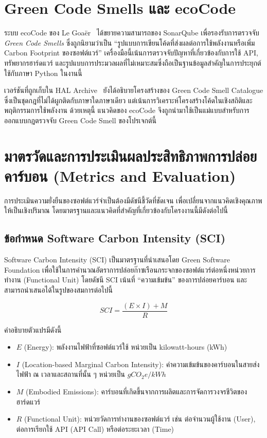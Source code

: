 
\section{Green Code Smells และ ecoCode}
ระบบ ecoCode ของ Le Goaër~\cite{legoaer2023ecocode} ได้ขยายความสามารถของ SonarQube เพื่อรองรับการตรวจจับ \textit{Green Code Smells} ซึ่งถูกนิยามว่าเป็น “รูปแบบการเขียนโค้ดที่ส่งผลต่อการใช้พลังงานหรือเพิ่ม Carbon Footprint ของซอฟต์แวร์” เครื่องมือนี้เน้นการตรวจจับปัญหาที่เกี่ยวข้องกับการใช้ API, ทรัพยากรฮาร์ดแวร์ และรูปแบบการประมวลผลที่ไม่เหมาะสมซึ่งถือเป็นฐานข้อมูลสำคัญในการประยุกต์ใช้กับภาษา Python ในงานนี้

เวอร์ชันที่ถูกเก็บใน HAL Archive~\cite{legoaer2023hal} ยังได้อธิบายโครงสร้างของ Green Code Smell Catalogue ซึ่งเป็นชุดกฎที่ไม่ได้ผูกติดกับภาษาใดภาษาเดียว แต่เน้นการวิเคราะห์โครงสร้างโค้ดในเชิงสถิติและพฤติกรรมการใช้พลังงาน ด้วยเหตุนี้ แนวคิดของ ecoCode จึงถูกนำมาใช้เป็นแม่แบบสำหรับการออกแบบกฎตรวจจับ Green Code Smell ของโปรเจกต์นี้


\section{มาตรวัดและการประเมินผลประสิทธิภาพการปล่อยคาร์บอน (Metrics and Evaluation)}
การประเมินความยั่งยืนของซอฟต์แวร์จำเป็นต้องมีดัชนีชี้วัดที่ชัดเจน เพื่อเปลี่ยนจากแนวคิดเชิงคุณภาพให้เป็นเชิงปริมาณ โดยมาตรฐานและแนวคิดที่สำคัญที่เกี่ยวข้องกับโครงงานนี้มีดังต่อไปนี้

\subsection{ข้อกำหนด Software Carbon Intensity (SCI)}
{\boldfont Software Carbon Intensity (SCI)} เป็นมาตรฐานที่นำเสนอโดย Green Software Foundation เพื่อใช้ในการคำนวณอัตราการปล่อยก๊าซเรือนกระจกของซอฟต์แวร์ต่อหนึ่งหน่วยการทำงาน (Functional Unit) โดยดัชนี SCI เน้นที่ ``ความเข้มข้น'' ของการปล่อยคาร์บอน และสามารถนำเสนอได้ในรูปของสมการต่อไปนี้~\cite{sciSpecification}

\[
SCI = \frac{(E \times I) + M}{R}
\]

คำอธิบายตัวแปรมีดังนี้
\begin{itemize}
    \item {\boldfont $E$ (Energy)}: พลังงานไฟฟ้าที่ซอฟต์แวร์ใช้ หน่วยเป็น kilowatt-hours (kWh)
    \item {\boldfont $I$ (Location-based Marginal Carbon Intensity)}: ค่าความเข้มข้นของคาร์บอนในสายส่งไฟฟ้า ณ เวลาและสถานที่นั้น ๆ หน่วยเป็น $gCO_2e/kWh$
    \item {\boldfont $M$ (Embodied Emissions)}: คาร์บอนที่เกิดขึ้นจากการผลิตและการจัดการวงจรชีวิตของฮาร์ดแวร์
    \item {\boldfont $R$ (Functional Unit)}: หน่วยวัดการทำงานของซอฟต์แวร์ เช่น ต่อจำนวนผู้ใช้งาน (User), ต่อการเรียกใช้ API (API Call) หรือต่อระยะเวลา (Time)
\end{itemize}

